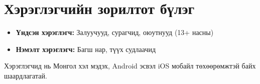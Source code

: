 	\section{Хэрэглэгчийн зорилтот бүлэг}
	
	\begin{itemize}
		\item \textbf{Үндсэн хэрэглэгч:} Залуучууд, сурагчид, оюутнууд (13+ насны)
		\item \textbf{Нэмэлт хэрэглэгч:} Багш нар, түүх судлаачид
	\end{itemize}
	
	Хэрэглэгчид нь Монгол хэл мэдэх, Android эсвэл iOS мобайл төхөөрөмжтэй байх шаардлагатай.
